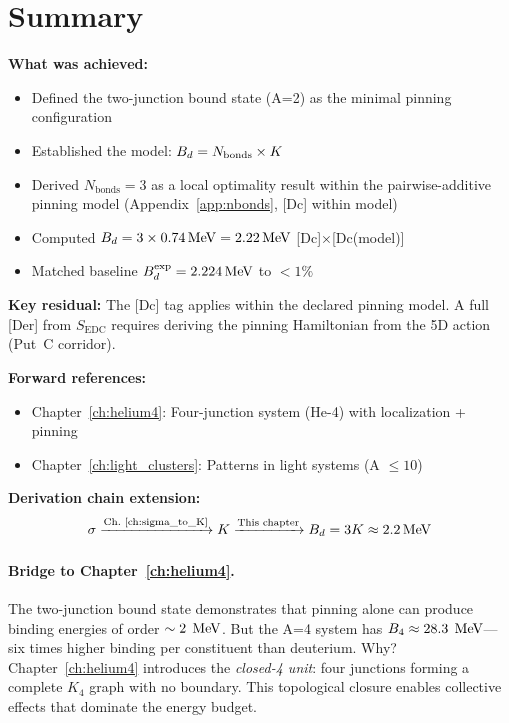 \section{Summary}
\label{sec:d:summary}

\begin{resultbox}
    \textbf{What was achieved:}
    \begin{itemize}
        \item Defined the two-junction bound state (A=2) as the minimal
              pinning configuration
        \item Established the model: $B_d = N_{\text{bonds}} \times K$
        \item Derived $N_{\text{bonds}} = 3$ as a local optimality result
              within the pairwise-additive pinning model
              (Appendix~\ref{app:nbonds}, [Dc] within model)
        \item Computed $B_d = 3 \times 0.74\,\mathrm{MeV} = 2.22\,\mathrm{MeV}$ [Dc]$\times$[Dc(model)]
        \item Matched baseline $B_d^{\text{exp}} = 2.224\,\mathrm{MeV}$ to $< 1\%$
    \end{itemize}

    \textbf{Key residual:} The [Dc] tag applies within the declared pinning
    model. A full [Der] from $S_{\text{EDC}}$ requires deriving the pinning
    Hamiltonian from the 5D action (Put~C corridor).
\end{resultbox}

\bigskip
\noindent
\textbf{Forward references:}
\begin{itemize}
    \item Chapter~\ref{ch:helium4}: Four-junction system (He-4) with
          localization + pinning
    \item Chapter~\ref{ch:light_clusters}: Patterns in light systems
          (A $\leq 10$)
\end{itemize}

\bigskip
\noindent
\textbf{Derivation chain extension:}
\begin{equation*}
    \sigma \xrightarrow{\text{Ch.~\ref{ch:sigma_to_K}}} K
    \xrightarrow{\text{This chapter}} B_d = 3K \approx 2.2\,\mathrm{MeV}
\end{equation*}

\paragraph{Bridge to Chapter~\ref{ch:helium4}.}
The two-junction bound state demonstrates that pinning alone can produce
binding energies of order $\sim 2\;\,\mathrm{MeV}$. But the A=4 system has
$B_4 \approx 28.3\;\,\mathrm{MeV}$---six times higher binding per constituent than
deuterium. Why? Chapter~\ref{ch:helium4} introduces the \emph{closed-4 unit}:
four junctions forming a complete $K_4$ graph with no boundary. This
topological closure enables collective effects that dominate the energy budget.

